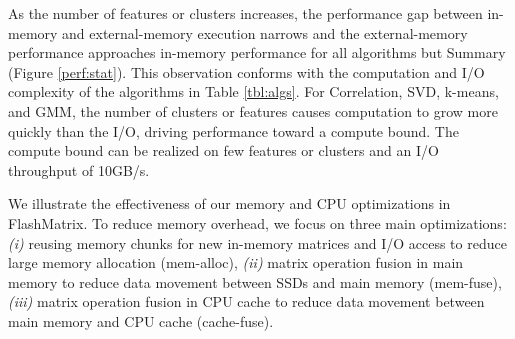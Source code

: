 As the number of features or clusters increases,
the performance gap between in-memory and external-memory execution
narrows and the external-memory performance approaches 
in-memory performance for all algorithms but Summary (Figure \ref{perf:stat}).
This observation conforms with the computation and I/O complexity of
the algorithms in Table \ref{tbl:algs}.
For Correlation, SVD, k-means, and GMM, the number of clusters or features causes computation
to grow more quickly than the I/O, driving performance toward a compute bound.
The compute bound can be realized on few features or clusters and an I/O throughput of 10GB/s.


We illustrate the effectiveness of our memory and CPU
optimizations in FlashMatrix. To reduce memory overhead, we focus on three
main optimizations: \textit{(i)} reusing memory chunks for new in-memory
matrices and I/O access to reduce large memory allocation (mem-alloc),
\textit{(ii)} matrix operation fusion in main memory to reduce data movement
between SSDs and main memory (mem-fuse), \textit{(iii)} matrix operation
fusion in CPU cache to reduce data movement between main memory and CPU cache
(cache-fuse).

